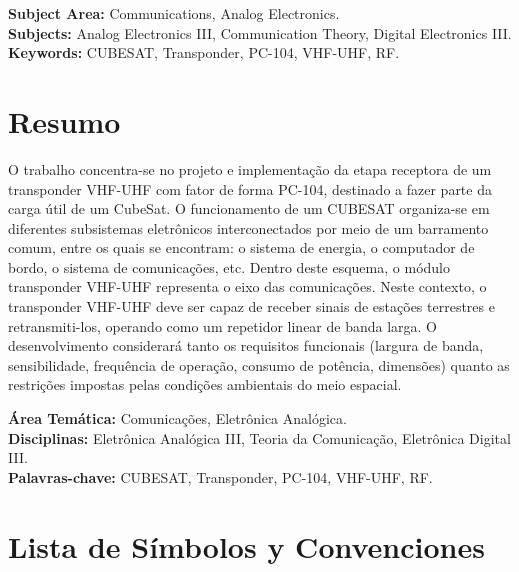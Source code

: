 \documentclass[11pt,a4paper,twoside]{report}
\begin{document}
	\vspace{1cm}
	\noindent \textbf{Subject Area:} Communications, Analog Electronics. \\
	\textbf{Subjects:} Analog Electronics III, Communication Theory, Digital Electronics III. \\
	\textbf{Keywords:} CUBESAT, Transponder, PC-104, VHF-UHF, RF.
	\clearpage
	
	\chapter*{Resumo}
	O trabalho concentra-se no projeto e implementação da etapa receptora de um transponder VHF-UHF com fator de forma PC-104, destinado a fazer parte da carga útil de um CubeSat. O funcionamento de um CUBESAT organiza-se em diferentes subsistemas eletrônicos interconectados por meio de um barramento comum, entre os quais se encontram: o sistema de energia, o computador de bordo, o sistema de comunicações, etc. Dentro deste esquema, o módulo transponder VHF-UHF representa o eixo das comunicações. Neste contexto, o transponder VHF-UHF deve ser capaz de receber sinais de estações terrestres e retransmiti-los, operando como um repetidor linear de banda larga. O desenvolvimento considerará tanto os requisitos funcionais (largura de banda, sensibilidade, frequência de operação, consumo de potência, dimensões) quanto as restrições impostas pelas condições ambientais do meio espacial.
	
	\vspace{1cm}
	\noindent \textbf{Área Temática:} Comunicações, Eletrônica Analógica. \\
	\textbf{Disciplinas:} Eletrônica Analógica III, Teoria da Comunicação, Eletrônica Digital III. \\
	\textbf{Palavras-chave:} CUBESAT, Transponder, PC-104, VHF-UHF, RF.
	\clearpage
	
	\tableofcontents
	\clearpage
	\listoftables
	\clearpage
	\listoffigures
	\clearpage
	\chapter*{Lista de Símbolos y Convenciones}
	
\end{document}
